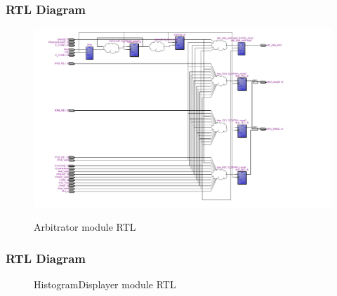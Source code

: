 \documentclass[12pt]{article}
\begin{document}
  \subsubsection{RTL Diagram}
    \begin{figure}[H]
    \begin{center}
        {\includegraphics[width=\textwidth]{Images/ArbitratorRTL.png}}
    \end{center}
    \caption{Arbitrator module RTL}
    \label{fig:arbitrator_rtl}
  \end{figure} 
  \subsubsection{RTL Diagram}
    \begin{figure}[H]
    \caption{HistogramDisplayer module RTL}
    \label{fig:histogram_displayer_rtl}
  \end{figure}
  
\end{document}
